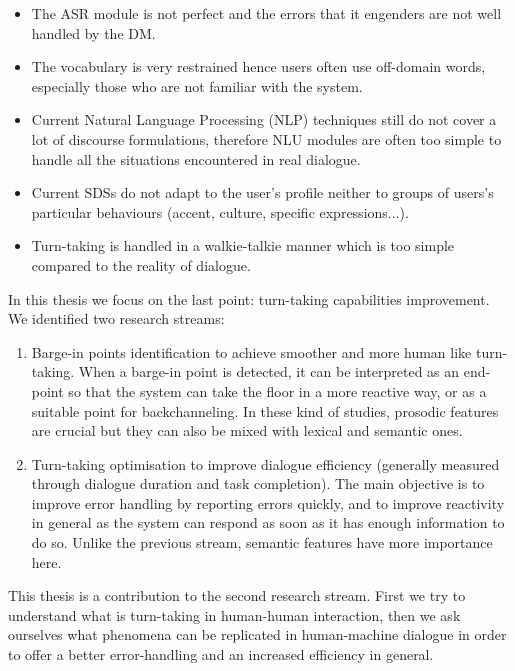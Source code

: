     \begin{itemize}
    	\item The ASR module is not perfect and the errors that it engenders are not well handled by the DM.
        \item The vocabulary is very restrained hence users often use off-domain words, especially those who are not familiar with the system.
        \item Current Natural Language Processing (NLP) techniques still do not cover a lot of discourse formulations, therefore NLU modules are often too simple to handle all the situations encountered in real dialogue.
        \item Current SDSs do not adapt to the user's profile neither to groups of users's particular behaviours (accent, culture, specific expressions...).
        \item Turn-taking is handled in a walkie-talkie manner which is too simple compared to the reality of dialogue.
    \end{itemize}
    
    In this thesis we focus on the last point: turn-taking capabilities improvement. We identified two research streams:
    
    \begin{enumerate}
    	\item Barge-in points identification to achieve smoother and more human like turn-taking. When a barge-in point is detected, it can be interpreted as an end-point so that the system can take the floor in a more reactive way, or as a suitable point for backchanneling. In these kind of studies, prosodic features are crucial but they can also be mixed with lexical and semantic ones.
        \item Turn-taking optimisation to improve dialogue efficiency (generally measured through dialogue duration and task completion). The main objective is to improve error handling by reporting errors quickly, and to improve reactivity in general as the system can respond as soon as it has enough information to do so. Unlike the previous stream, semantic features have more importance here.
    \end{enumerate}
    
    This thesis is a contribution to the second research stream. First we try to understand what is turn-taking in human-human interaction, then we ask ourselves what phenomena can be replicated in human-machine dialogue in order to offer a better error-handling and an increased efficiency in general.
    
    
    
    
    
    

